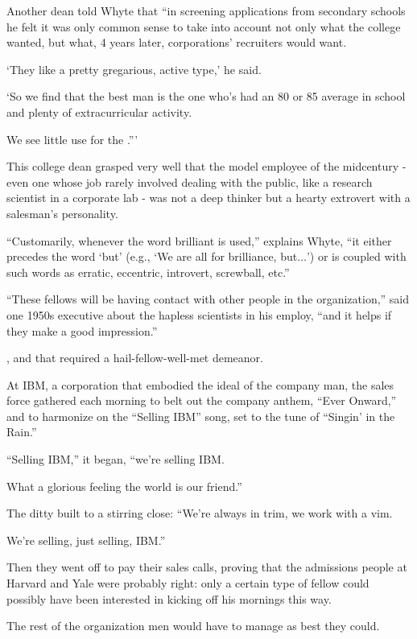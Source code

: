 \documentclass[oneside]{article}
\numberwithin{equation}{section}
\begin{document}
Another dean told Whyte that ``in screening applications from secondary schools he felt it was only common sense to take into account not only what the college wanted, but what, 4 years later, corporations' recruiters would want.

`They like a pretty gregarious, active type,' he said.

`So we find that the best man is the one who's had an 80 or 85 average in school and plenty of extracurricular activity.

We see little use for the .'''

%
This college dean grasped very well that the model employee of the midcentury - even one whose job rarely involved dealing with the public, like a research scientist in a corporate lab - was not a deep thinker but a hearty extrovert with a salesman's personality.

``Customarily, whenever the word brilliant is used,'' explains Whyte, ``it either precedes the word `but' (e.g., `We are all for brilliance, but$\ldots$') or is coupled with such words as erratic, eccentric, introvert, screwball, etc.''

``These fellows will be having contact with other people in the organization,'' said one 1950s executive about the hapless scientists in his employ, ``and it helps if they make a good impression.''

%
, and that required a hail-fellow-well-met demeanor.

At IBM, a corporation that embodied the ideal of the company man, the sales force gathered each morning to belt out the company anthem, ``Ever Onward,'' and to harmonize on the ``Selling IBM'' song, set to the tune of ``Singin' in the Rain.''

``Selling IBM,'' it began, ``we're selling IBM.

What a glorious feeling the world is our friend.''

The ditty built to a stirring close: ``We're always in trim, we work with a vim.

We're selling, just selling, IBM.''

%
Then they went off to pay their sales calls, proving that the admissions people at Harvard and Yale were probably right: only a certain type of fellow could possibly have been interested in kicking off his mornings this way.

%
The rest of the organization men would have to manage as best they could.
\end{document}
